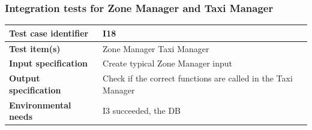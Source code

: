 \documentclass[a4paper,11pt]{report} %
\begin{document}
		\subsubsection{Integration tests for Zone Manager and Taxi Manager} \label{sec:3.1.15}
			\begin{minipage}{\linewidth}
			\end{minipage}		
		\begin{center}
			\renewcommand{\arraystretch}{1.2}
			\setlength{\tabcolsep}{24pt}
			\begin{tabular}{ l  p{9cm}}\hline
				\textbf{Test case identifier} & I18\\\hline
				\textbf{Test item(s)} & Zone Manager \textrightarrow Taxi Manager\\\hline
				\textbf{Input specification} & Create typical Zone Manager input \\\hline
				\textbf{Output specification} & Check if the correct functions are called in the Taxi Manager\\\hline
				\textbf{Environmental needs} &  I3 succeeded, the DB\\\hline
			\end{tabular}
		\end{center}
		
		\pagebreak		
\end{document}
